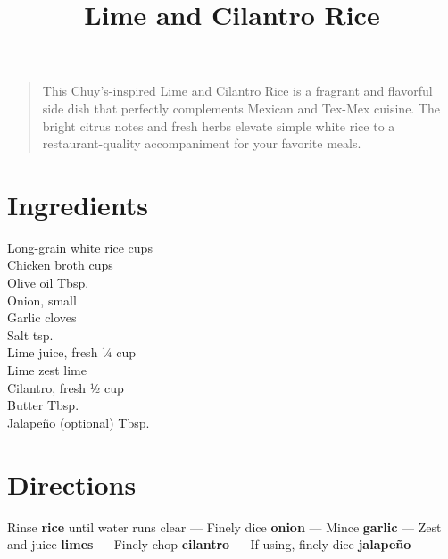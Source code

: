 \documentclass[11pt,letterpaper]{article}
\title{Lime and Cilantro Rice}
\author{}
\date{}
\begin{document}
\maketitle
\thispagestyle{empty}

\begin{quote}
\small
\begin{em}
This Chuy's-inspired Lime and Cilantro Rice is a fragrant and flavorful side dish that perfectly complements Mexican and Tex-Mex cuisine. The bright citrus notes and fresh herbs elevate simple white rice to a restaurant-quality accompaniment for your favorite meals.
\end{em}
\end{quote}

\section*{Ingredients}
\setlength{\columnsep}{20pt}
\begin{multicols}{2}
\noindent
    Long-grain white rice  cups \\
    Chicken broth  cups \\
    Olive oil  Tbsp. \\
    Onion, small  \\
    Garlic cloves  \\
    Salt  tsp. \\
    \columnbreak
    Lime juice, fresh \dotfill ¼ cup \\
    Lime zest  lime \\
    Cilantro, fresh \dotfill ½ cup \\
    Butter  Tbsp. \\
    Jalapeño (optional)  Tbsp. \\
\end{multicols}

\section*{Directions}

\noindent
Rinse \textbf{rice} until water runs clear ---
Finely dice \textbf{onion} ---
Mince \textbf{garlic} ---
Zest and juice \textbf{limes} ---
Finely chop \textbf{cilantro} ---
If using, finely dice \textbf{jalapeño}
\end{document}
